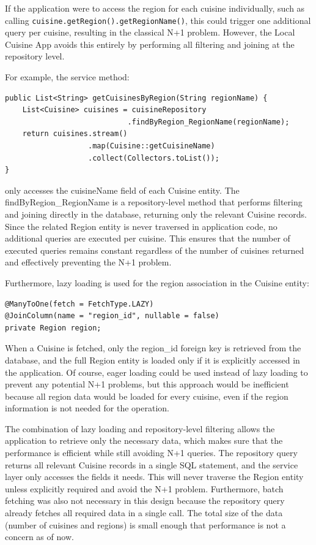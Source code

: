 If the application were to access the region for each cuisine individually, such as calling \texttt{cuisine.getRegion().getRegionName()},
this could trigger one additional query per cuisine, resulting in the classical N+1 problem.
However, the Local Cuisine App avoids this entirely by performing all filtering and joining at the repository level. 

For example, the service method:

\begin{verbatim}
public List<String> getCuisinesByRegion(String regionName) {
    List<Cuisine> cuisines = cuisineRepository
                            .findByRegion_RegionName(regionName);
    return cuisines.stream()
                   .map(Cuisine::getCuisineName)
                   .collect(Collectors.toList());
}
\end{verbatim}

only accesses the cuisineName field of each Cuisine entity. 
The findByRegion\_RegionName is a repository-level method that performs filtering and joining directly in the database, 
returning only the relevant Cuisine records. 
Since the related Region entity is never traversed in application code, no additional queries are executed per cuisine. 
This ensures that the number of executed queries remains constant regardless of the number of cuisines returned and effectively preventing the N+1 problem.

Furthermore, lazy loading is used for the region association in the Cuisine entity:

\begin{verbatim}
@ManyToOne(fetch = FetchType.LAZY)
@JoinColumn(name = "region_id", nullable = false) 
private Region region;
\end{verbatim}

When a Cuisine is fetched, only the region\_id foreign key is retrieved from the database, 
and the full Region entity is loaded only if it is explicitly accessed in the application. 
Of course, eager loading could be used instead of lazy loading to prevent any potential N+1 problems, but this approach would be inefficient because
all region data would be loaded for every cuisine, even if the region information is not needed for the operation. 

The combination of lazy loading and repository-level filtering allows the application to retrieve only the necessary data, 
which makes sure that the performance is efficient while still avoiding N+1 queries. 
The repository query returns all relevant Cuisine records in a single SQL statement, 
and the service layer only accesses the fields it needs. This will never traverse the Region entity unless explicitly required and avoid the N+1 problem.
Furthermore, batch fetching was also not necessary in this design because the repository query already fetches all required data in a single call. 
The total size of the data (number of cuisines and regions) is small enough that performance is not a concern as of now. \\

